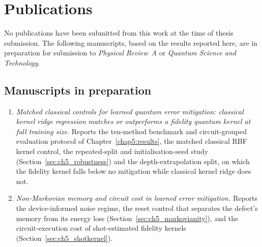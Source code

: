 \cleardoublepage
{}
{}
\chapter*{Publications}


No publications have been submitted from this work at the time of thesis
submission. The following manuscripts, based on the results reported here, are in
preparation for submission to \textit{Physical Review~A} or \textit{Quantum
Science and Technology}.

\section*{Manuscripts in preparation}

\begin{enumerate}
    \item \textit{Matched classical controls for learned quantum error mitigation:
    classical kernel ridge regression matches or outperforms a fidelity quantum
    kernel at full training size.}
    Reports the ten-method benchmark and circuit-grouped evaluation protocol of
    Chapter~\ref{chap5:results}, the matched classical RBF kernel control, the
    repeated-split and initialisation-seed study
    (Section~\ref{sec:ch5_robustness}) and the depth-extrapolation split, on
    which the fidelity kernel falls below no mitigation while classical kernel
    ridge does not.

    \item \textit{Non-Markovian memory and circuit cost in learned error
    mitigation.}
    Reports the device-informed noise regime, the reset control that separates
    the defect's memory from its energy loss
    (Section~\ref{sec:ch5_markovianity}), and the circuit-execution cost of
    shot-estimated fidelity kernels (Section~\ref{sec:ch5_shotkernel}).
\end{enumerate}
